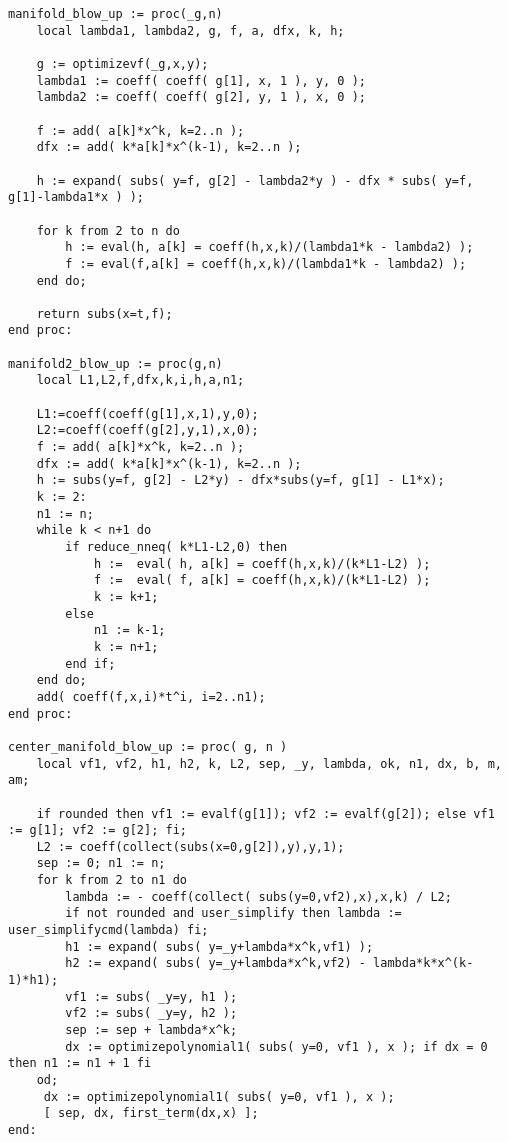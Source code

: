 \documentclass[a4paper,10pt]{article}
\begin{document}
\begin{lstlisting}[name=blowup]
manifold_blow_up := proc(_g,n)
    local lambda1, lambda2, g, f, a, dfx, k, h;

    g := optimizevf(_g,x,y);
    lambda1 := coeff( coeff( g[1], x, 1 ), y, 0 );
    lambda2 := coeff( coeff( g[2], y, 1 ), x, 0 );

    f := add( a[k]*x^k, k=2..n );
    dfx := add( k*a[k]*x^(k-1), k=2..n );

    h := expand( subs( y=f, g[2] - lambda2*y ) - dfx * subs( y=f, g[1]-lambda1*x ) );

    for k from 2 to n do
        h := eval(h, a[k] = coeff(h,x,k)/(lambda1*k - lambda2) );
        f := eval(f,a[k] = coeff(h,x,k)/(lambda1*k - lambda2) );
    end do;

    return subs(x=t,f);
end proc:

manifold2_blow_up := proc(g,n)
    local L1,L2,f,dfx,k,i,h,a,n1;

    L1:=coeff(coeff(g[1],x,1),y,0);
    L2:=coeff(coeff(g[2],y,1),x,0);
    f := add( a[k]*x^k, k=2..n );
    dfx := add( k*a[k]*x^(k-1), k=2..n );
    h := subs(y=f, g[2] - L2*y) - dfx*subs(y=f, g[1] - L1*x);
    k := 2:
    n1 := n;
    while k < n+1 do
        if reduce_nneq( k*L1-L2,0) then
            h :=  eval( h, a[k] = coeff(h,x,k)/(k*L1-L2) );
            f :=  eval( f, a[k] = coeff(h,x,k)/(k*L1-L2) );
            k := k+1;
        else
            n1 := k-1;
            k := n+1;
        end if;
    end do;
    add( coeff(f,x,i)*t^i, i=2..n1);
end proc:

center_manifold_blow_up := proc( g, n )
    local vf1, vf2, h1, h2, k, L2, sep, _y, lambda, ok, n1, dx, b, m, am;

    if rounded then vf1 := evalf(g[1]); vf2 := evalf(g[2]); else vf1 := g[1]; vf2 := g[2]; fi;
    L2 := coeff(collect(subs(x=0,g[2]),y),y,1);
    sep := 0; n1 := n;
    for k from 2 to n1 do
        lambda := - coeff(collect( subs(y=0,vf2),x),x,k) / L2;
        if not rounded and user_simplify then lambda := user_simplifycmd(lambda) fi;
        h1 := expand( subs( y=_y+lambda*x^k,vf1) );
        h2 := expand( subs( y=_y+lambda*x^k,vf2) - lambda*k*x^(k-1)*h1);
        vf1 := subs( _y=y, h1 );
        vf2 := subs( _y=y, h2 );
        sep := sep + lambda*x^k;
        dx := optimizepolynomial1( subs( y=0, vf1 ), x ); if dx = 0 then n1 := n1 + 1 fi
    od;
     dx := optimizepolynomial1( subs( y=0, vf1 ), x );
     [ sep, dx, first_term(dx,x) ];
end:
\end{lstlisting}
\end{document}
